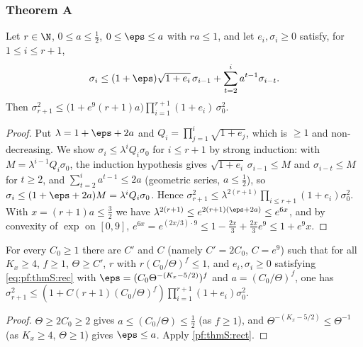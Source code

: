 \subsubsection{Theorem A}\label{sec:pf:thmS:thmA}

\begin{lemma}\label{pf:thmS:rect}
Let $r\in\N$, $0\le a\le\frac12$, $0\le\eps\le a$ with $ra\le1$, and let $e_i,\sigma_i\ge0$ satisfy, for $1\le i\le r+1$,
\begin{equation}\label{eq:pf:thmS:rec}
\sigma_i\le(1+\eps)\sqrt{1+e_i}\,\sigma_{i-1}+\sum_{t=2}^ia^{t-1}\sigma_{i-t}.
\end{equation}
Then $\sigma_{r+1}^2\le\bigl(1+e^9(r+1)a\bigr)\prod_{i=1}^{r+1}(1+e_i)\,\sigma_0^2$.
\end{lemma}

\begin{proof}
Put $\lambda=1+\eps+2a$ and $Q_i=\prod_{j=1}^i\sqrt{1+e_j}$, which is $\ge1$ and non-decreasing. We show
$\sigma_i\le\lambda^iQ_i\sigma_0$ for $i\le r+1$ by strong induction: with $M=\lambda^{i-1}Q_i\sigma_0$, the induction
hypothesis gives $\sqrt{1+e_i}\,\sigma_{i-1}\le M$ and $\sigma_{i-t}\le M$ for $t\ge2$, and $\sum_{t=2}^ia^{t-1}\le2a$
(geometric series, $a\le\frac12$), so $\sigma_i\le(1+\eps+2a)M=\lambda^iQ_i\sigma_0$. Hence $\sigma_{r+1}^2\le
\lambda^{2(r+1)}\prod_{i\le r+1}(1+e_i)\sigma_0^2$. With $x=(r+1)a\le\frac32$ we have
$\lambda^{2(r+1)}\le e^{2(r+1)(\eps+2a)}\le e^{6x}$, and by convexity of $\exp$ on $[0,9]$,
$e^{6x}=e^{(2x/3)\cdot9}\le1-\frac{2x}3+\frac{2x}3e^9\le1+e^9x$.
\end{proof}

\begin{corollary}\label{pf:thmS:jointA}
For every $C_0\ge1$ there are $C'$ and $C$ (namely $C'=2C_0$, $C=e^9$) such that for all $K_x\ge4$, $f\ge1$,
$\Theta\ge C'$, $r$ with $r(C_0/\Theta)^f\le1$, and $e_i,\sigma_i\ge0$ satisfying \eqref{eq:pf:thmS:rec} with
$\eps=(C_0\Theta^{-(K_x-5/2)})^f$ and $a=(C_0/\Theta)^f$, one has
$\sigma_{r+1}^2\le(1+C(r+1)(C_0/\Theta)^f)\prod_{i=1}^{r+1}(1+e_i)\sigma_0^2$.
\end{corollary}

\begin{proof}
$\Theta\ge2C_0\ge2$ gives $a\le(C_0/\Theta)\le\frac12$ (as $f\ge1$), and $\Theta^{-(K_x-5/2)}\le\Theta^{-1}$ (as
$K_x\ge4$, $\Theta\ge1$) gives $\eps\le a$. Apply \cref{pf:thmS:rect}.
\end{proof}

